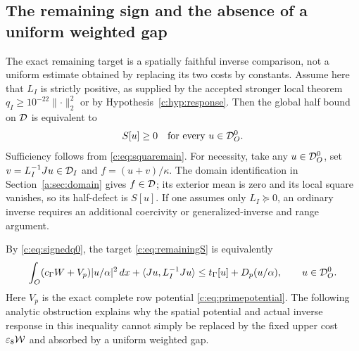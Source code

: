 \documentclass[11pt,a4paper]{article}
\numberwithin{equation}{section}
\theoremstyle{definition}\newtheorem{definition}[theorem]{Definition}
\theoremstyle{remark}\newtheorem{remark}[theorem]{Remark}
\newcommand{\tg}{t_\Gamma}\newcommand{\cg}{c_\Gamma}
\newcommand{\ip}[2]{\langle#1,#2\rangle}\newcommand{\norm}[1]{\lVert#1\rVert}\newcommand{\abs}[1]{\lvert#1\rvert}
\begin{document}
\subsection{The remaining sign and the absence of a uniform weighted gap}\label{c:sec:limits}
The exact remaining target is a spatially faithful inverse comparison, not a uniform estimate obtained by replacing its two costs by constants. Assume here that $L_I$ is strictly positive, as supplied by the accepted stronger local theorem $q_I\ge10^{-22}\norm{\cdot}_2^2$ or by Hypothesis~\ref{c:hyp:response}. Then the global half bound on $\mathcal D$ is equivalent to
\begin{equation}\label{c:eq:remainingS}
 S[u]\ge0\quad\hbox{for every }u\in\mathcal D_O^0.
\end{equation}
Sufficiency follows from \eqref{c:eq:squaremain}.
For necessity, take any $u\in\mathcal D_O^0$, set $v=L_I^{-1}Ju\in\mathcal D_I$ and
$f=(u+v)/\kappa$. The domain identification in Section~\ref{a:sec:domain} gives $f\in\mathcal D$; its exterior mean is zero and its local square vanishes, so its half-defect is $S[u]$.
If one assumes only $L_I\succeq0$, an ordinary inverse requires an additional coercivity or generalized-inverse and range argument.

By \eqref{c:eq:signedq0}, the target \eqref{c:eq:remainingS} is equivalently
\begin{equation}\label{c:eq:spatialtarget}
 \int_O(\cg W+V_p)|u/\alpha|^2\,dx+\ip{Ju}{L_I^{-1}Ju}
 \le\tg[u]+D_p(u/\alpha),\qquad u\in\D_O^0.
\end{equation}
Here $V_p$ is the exact complete row potential \eqref{c:eq:primepotential}.
The following analytic obstruction explains why the spatial potential and actual inverse response in this inequality cannot simply be replaced by the fixed upper cost $\varepsilon_8\mathcal W$ and absorbed by a uniform weighted gap.
\end{document}
